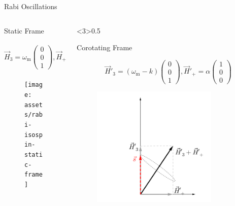 \documentclass[9pt]{beamer}
\begin{document}
\begin{darkframes}
\begin{frame}{Rabi Oscillations}
{\begin{columns}[T]
\begin{column}
\centering
Static Frame

\begin{equation*}
    \vec H_3 = \omega_{\mathrm m}\begin{pmatrix}
    0 \\
    0\\
    1
    \end{pmatrix}, \vec H_+ = \alpha  \begin{pmatrix}
    \cos( kt) \\
    -\sin(kt)\\
    0
    \end{pmatrix}
\end{equation*}

\begin{figure}
    \centering
    \texttt{[image: assets/rabi-isospin-static-frame]}
\end{figure}


\end{column}%
\begin{column}<3>{0.5\textwidth}

\centering
Corotating Frame

\begin{equation*}
    \vec H'_3 = (\omega_{\mathrm m} - k)\begin{pmatrix}
    0 \\
    0\\
    1
    \end{pmatrix}, \vec H'_+ = \alpha  \begin{pmatrix}
    1 \\
    0\\
    0
    \end{pmatrix}
\end{equation*}

\begin{figure}
    \centering
    \includegraphics[width=0.8\textwidth]{assets/rabi-isospin-rotating-frame}
\end{figure}






\end{column}
\end{columns}}
\end{frame}
\end{darkframes}
\end{document}
